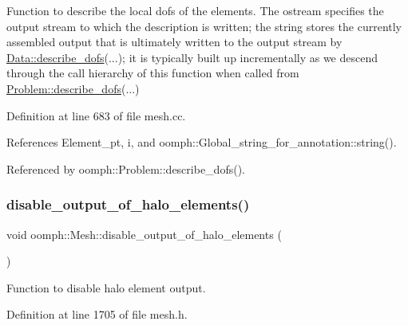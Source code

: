 Function to describe the local dofs of the elements. The ostream specifies the output stream to which the description is written; the string stores the currently assembled output that is ultimately written to the output stream by \hyperlink{classoomph_1_1Data_a2dae16e2dcff9a40029f834c83364df5}{Data\+::describe\+\_\+dofs}(...); it is typically built up incrementally as we descend through the call hierarchy of this function when called from \hyperlink{classoomph_1_1Problem_abc103804eb319ae0b3d43870cc3e1eaf}{Problem\+::describe\+\_\+dofs}(...) 



Definition at line 683 of file mesh.\+cc.



References Element\+\_\+pt, i, and oomph\+::\+Global\+\_\+string\+\_\+for\+\_\+annotation\+::string().



Referenced by oomph\+::\+Problem\+::describe\+\_\+dofs().

\mbox{\label{classoomph_1_1Mesh_a8abe965de3d3686511f311421c614fa0}} 
\subsubsection{\texorpdfstring{disable\+\_\+output\+\_\+of\+\_\+halo\+\_\+elements()}{disable\_output\_of\_halo\_elements()}}
{\footnotesize\ttfamily void oomph\+::\+Mesh\+::disable\+\_\+output\+\_\+of\+\_\+halo\+\_\+elements (\begin{DoxyParamCaption}{ }\end{DoxyParamCaption})\hspace{0.3cm}{\ttfamily [inline]}}



Function to disable halo element output. 



Definition at line 1705 of file mesh.\+h.

\mbox{\label{classoomph_1_1Mesh_a1558bf3c66e1d0bef3ccb4ab9e293499}} 
